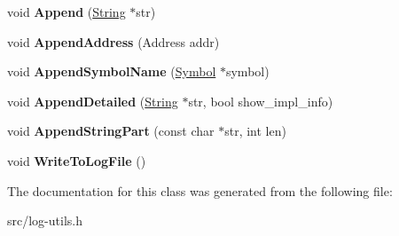 \begin{DoxyCompactItemize}
\item 
\hypertarget{classv8_1_1internal_1_1_log_1_1_b_a_s_e___e_m_b_e_d_d_e_d_abac8ca72f987e2c57fa475a5ce06d1f2}{}void {\bfseries Append} (\hyperlink{classv8_1_1internal_1_1_string}{String} $\ast$str)\label{classv8_1_1internal_1_1_log_1_1_b_a_s_e___e_m_b_e_d_d_e_d_abac8ca72f987e2c57fa475a5ce06d1f2}

\item 
\hypertarget{classv8_1_1internal_1_1_log_1_1_b_a_s_e___e_m_b_e_d_d_e_d_a012f003f168ced14529e1b49b93aef6d}{}void {\bfseries Append\+Address} (Address addr)\label{classv8_1_1internal_1_1_log_1_1_b_a_s_e___e_m_b_e_d_d_e_d_a012f003f168ced14529e1b49b93aef6d}

\item 
\hypertarget{classv8_1_1internal_1_1_log_1_1_b_a_s_e___e_m_b_e_d_d_e_d_aef171f48186258ec5e7a268f0b3d2f2d}{}void {\bfseries Append\+Symbol\+Name} (\hyperlink{classv8_1_1internal_1_1_symbol}{Symbol} $\ast$symbol)\label{classv8_1_1internal_1_1_log_1_1_b_a_s_e___e_m_b_e_d_d_e_d_aef171f48186258ec5e7a268f0b3d2f2d}

\item 
\hypertarget{classv8_1_1internal_1_1_log_1_1_b_a_s_e___e_m_b_e_d_d_e_d_a38a3fa294739ab23d3655f0f708e43d7}{}void {\bfseries Append\+Detailed} (\hyperlink{classv8_1_1internal_1_1_string}{String} $\ast$str, bool show\+\_\+impl\+\_\+info)\label{classv8_1_1internal_1_1_log_1_1_b_a_s_e___e_m_b_e_d_d_e_d_a38a3fa294739ab23d3655f0f708e43d7}

\item 
\hypertarget{classv8_1_1internal_1_1_log_1_1_b_a_s_e___e_m_b_e_d_d_e_d_ac6780f6731458ef1567e2adc37a91cf4}{}void {\bfseries Append\+String\+Part} (const char $\ast$str, int len)\label{classv8_1_1internal_1_1_log_1_1_b_a_s_e___e_m_b_e_d_d_e_d_ac6780f6731458ef1567e2adc37a91cf4}

\item 
\hypertarget{classv8_1_1internal_1_1_log_1_1_b_a_s_e___e_m_b_e_d_d_e_d_a7e6f38e7cddc4f4c652fc654283cd7d0}{}void {\bfseries Write\+To\+Log\+File} ()\label{classv8_1_1internal_1_1_log_1_1_b_a_s_e___e_m_b_e_d_d_e_d_a7e6f38e7cddc4f4c652fc654283cd7d0}

\end{DoxyCompactItemize}


The documentation for this class was generated from the following file\+:\begin{DoxyCompactItemize}
\item 
src/log-\/utils.\+h\end{DoxyCompactItemize}
